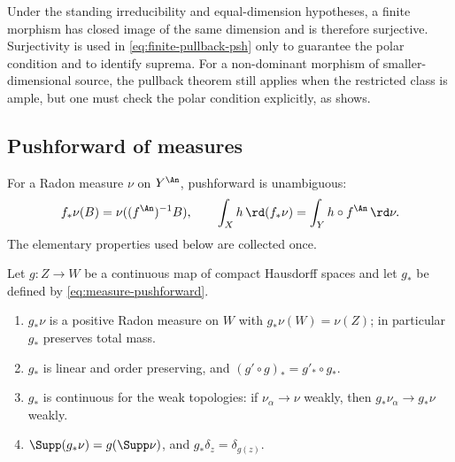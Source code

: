 \begin{remark}
\label{rem:ch30-finite-surjectivity}
Under the standing irreducibility and equal-dimension hypotheses, a finite
morphism has closed image of the same dimension and is therefore
surjective.  Surjectivity is used in
\eqref{eq:finite-pullback-psh} only to guarantee the polar condition and to
identify suprema.  For a non-dominant morphism of smaller-dimensional
source, the pullback theorem still applies when the restricted class is
ample, but one must check the polar condition explicitly, as
 shows.
\end{remark}

\subsection{Pushforward of measures}
\label{sec:ch30-finite-pushforward}

For a Radon measure \(\nu\) on \(Y^{\An}\), pushforward is unambiguous:
\begin{equation}
\label{eq:measure-pushforward}
       f_*\nu(B)=\nu((f^{\An})^{-1}B),\qquad
       \int_X h\,\rd(f_*\nu)=\int_Y h\circ f^{\An}\,\rd \nu.
\end{equation}
The elementary properties used below are collected once.

\begin{lemma}
\label{lem:ch30-pushforward-basic}
Let \(g:Z\to W\) be a continuous map of compact Hausdorff spaces and let
\(g_*\) be defined by \eqref{eq:measure-pushforward}.
\begin{enumerate}
\item\label{itm:ch30-pf:radon}
\(g_*\nu\) is a positive Radon measure on \(W\) with
\(g_*\nu(W)=\nu(Z)\); in particular \(g_*\) preserves total mass.
\item\label{itm:ch30-pf:linear}
\(g_*\) is linear and order preserving, and \((g'\circ g)_*=g'_*\circ g_*\).
\item\label{itm:ch30-pf:weak}
\(g_*\) is continuous for the weak topologies: if \(\nu_\alpha\to\nu\)
weakly, then \(g_*\nu_\alpha\to g_*\nu\) weakly.
\item\label{itm:ch30-pf:support}
\(\Supp(g_*\nu)=g(\Supp\nu)\), and \(g_*\delta_z=\delta_{g(z)}\).
\end{enumerate}
\end{lemma}

